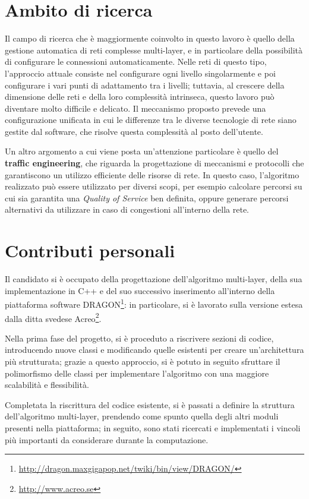 \documentclass[10pt,a4paper]{article}
\begin{document}
\section*{Ambito di ricerca}

Il campo di ricerca che è maggiormente coinvolto in questo lavoro è
quello della gestione automatica di reti complesse multi-layer, e in
particolare della possibilità di configurare le connessioni
automaticamente. Nelle reti di questo tipo, l'approccio attuale
consiste nel configurare ogni livello singolarmente e poi configurare
i vari punti di adattamento tra i livelli; tuttavia, al crescere della
dimensione delle reti e della loro complessità intrinseca, questo
lavoro può diventare molto difficile e delicato. Il meccanismo
proposto prevede una configurazione unificata in cui le differenze tra
le diverse tecnologie di rete siano gestite dal software, che risolve
questa complessità al posto dell'utente.

Un altro argomento a cui viene posta un'attenzione particolare è
quello del \textbf{traffic engineering}, che riguarda la progettazione
di meccanismi e protocolli che garantiscono un utilizzo efficiente
delle risorse di rete. In questo caso, l'algoritmo realizzato può
essere utilizzato per diversi scopi, per esempio calcolare percorsi su
cui sia garantita una \textit{Quality of Service} ben definita, oppure
generare percorsi alternativi da utilizzare in caso di congestioni
all'interno della rete.


\section*{Contributi personali}

Il candidato si è occupato della progettazione dell'algoritmo
multi-layer, della sua implementazione in C++ e del suo successivo
inserimento all'interno della piattaforma software
DRAGON\footnote{\url{http://dragon.maxgigapop.net/twiki/bin/view/DRAGON/}}:
in particolare, si è lavorato sulla versione estesa dalla ditta
svedese Acreo\footnote{\url{http://www.acreo.se}}.

Nella prima fase del progetto, si è proceduto a riscrivere sezioni di
codice, introducendo nuove classi e modificando quelle esistenti per
creare un'architettura più strutturata; grazie a questo approccio, si
è potuto in seguito sfruttare il polimorfismo delle classi per
implementare l'algoritmo con una maggiore scalabilità e flessibilità.

Completata la riscrittura del codice esistente, si è passati a
definire la struttura dell'algoritmo multi-layer, prendendo come
spunto quella degli altri moduli presenti nella piattaforma; in
seguito, sono stati ricercati e implementati i vincoli più importanti
da considerare durante la computazione.
\end{document}
